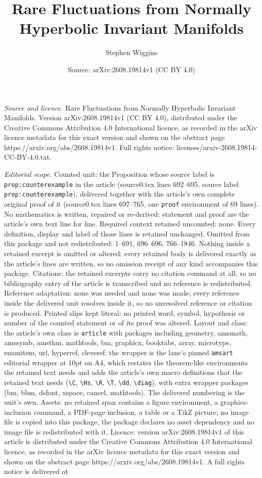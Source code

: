 \documentclass[10pt,a4paper]{amsart}
\title[Rare Fluctuations from Normally Hyperbolic Invariant Manifol]{Rare Fluctuations from Normally Hyperbolic Invariant Manifolds}
\author{Stephen Wiggins}
\date{Source: arXiv:2608.19814v1 (CC BY 4.0)}
\begin{document}
\maketitle

\noindent\emph{Source and licence.} Rare Fluctuations from Normally Hyperbolic Invariant Manifolds. Version arXiv:2608.19814v1 (CC BY 4.0), distributed under the Creative Commons Attribution 4.0 International licence, as recorded in the arXiv licence metadata for this exact version and shown on the abstract page https://arxiv.org/abs/2608.19814v1. Full rights notice: licenses/arxiv-2608.19814-CC-BY-4.0.txt.\par\smallskip

\noindent\textit{Editorial scope.} Counted unit: the Proposition whose source label is \texttt{prop:counterexample} in the article (source0.tex lines 692--695, source label \texttt{prop:counterexample}), delivered together with the article's own complete original proof of it (source0.tex lines 697--765, one \texttt{proof} environment of 69 lines). No mathematics is written, repaired or re-derived: statement and proof are the article's own text line for line. Required context retained uncounted: none. Every definition, display and label of those lines is retained unchanged. Omitted from this package and not redistributed: 1--691, 696--696, 766--1846. Nothing inside a retained excerpt is omitted or altered: every retained body is delivered exactly as the article's lines are written, so no omission receipt of any kind accompanies this package. Citations: the retained excerpts carry no citation command at all, so no bibliography entry of the article is transcribed and no reference is redistributed. Reference adaptation: none was needed and none was made; every reference inside the delivered unit resolves inside it, so no unresolved reference or citation is produced. Printed slips kept literal: no printed word, symbol, hypothesis or number of the counted statement or of its proof was altered. Layout and class: the article's own class is \texttt{article} with packages including geometry, amsmath, amssymb, amsthm, mathtools, bm, graphicx, booktabs, array, microtype, enumitem, url, hyperref, cleveref; the wrapper is the lane's pinned \texttt{amsart} editorial wrapper at 10pt on A4, which restates the theorem-like environments the retained text needs and adds the article's own macro definitions that the retained text needs (\texttt{\textbackslash C}, \texttt{\textbackslash Hs}, \texttt{\textbackslash R}, \texttt{\textbackslash T}, \texttt{\textbackslash dd}, \texttt{\textbackslash diag}), with extra wrapper packages (bm, bbm, dsfont, xspace, cancel, mathtools). The delivered numbering is the unit's own. Assets: no retained span contains a figure environment, a graphics-inclusion command, a PDF-page inclusion, a table or a TikZ picture; no image file is copied into this package, the package declares no asset dependency and no image file is redistributed with it. Licence: version arXiv:2608.19814v1 of this article is distributed under the Creative Commons Attribution 4.0 International licence, as recorded in the arXiv licence metadata for this exact version and shown on the abstract page https://arxiv.org/abs/2608.19814v1. A full rights notice is delivered at 
\end{document}
